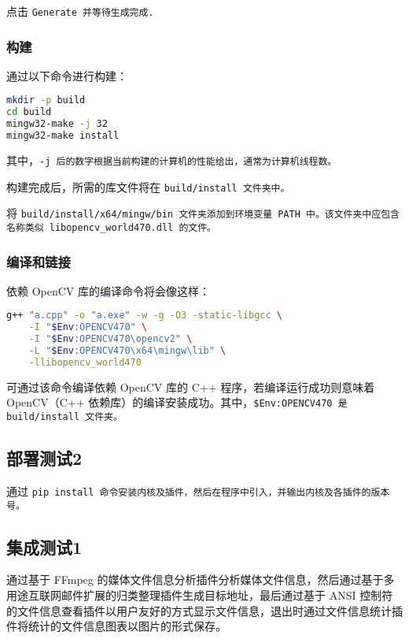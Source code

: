 点击 \tt{Generate} 并等待生成完成.

\subsubsection{构建}

通过以下命令进行构建：

\begin{lstlisting}[language=bash]
mkdir -p build
cd build
mingw32-make -j 32
mingw32-make install
\end{lstlisting}

其中，\tt{-j} 后的数字根据当前构建的计算机的性能给出，通常为计算机线程数。

构建完成后，所需的库文件将在 \tt{build/install} 文件夹中。

将 \tt{build/install/x64/mingw/bin} 文件夹添加到环境变量 \tt{PATH} 中。该文件夹中应包含名称类似 \tt{libopencv\_world470.dll} 的文件。

\subsubsection{编译和链接}

依赖 OpenCV 库的编译命令将会像这样：

\begin{lstlisting}[language=bash]
g++ "a.cpp" -o "a.exe" -w -g -O3 -static-libgcc \
    -I "$Env:OPENCV470" \
    -I "$Env:OPENCV470\opencv2" \
    -L "$Env:OPENCV470\x64\mingw\lib" \
    -llibopencv_world470
\end{lstlisting}

可通过该命令编译依赖 OpenCV 库的 C++ 程序，若编译运行成功则意味着 OpenCV（C++ 依赖库）的编译安装成功。其中，\tt{\$Env:OPENCV470} 是 \tt{build/install} 文件夹。

\subsection{部署测试2}

通过 \tt{pip install} 命令安装内核及插件，然后在程序中引入，并输出内核及各插件的版本号。

\subsection{集成测试1}

通过基于 FFmpeg 的媒体文件信息分析插件分析媒体文件信息，然后通过基于多用途互联网邮件扩展的归类整理插件生成目标地址，最后通过基于 ANSI 控制符的文件信息查看插件以用户友好的方式显示文件信息，退出时通过文件信息统计插件将统计的文件信息图表以图片的形式保存。

